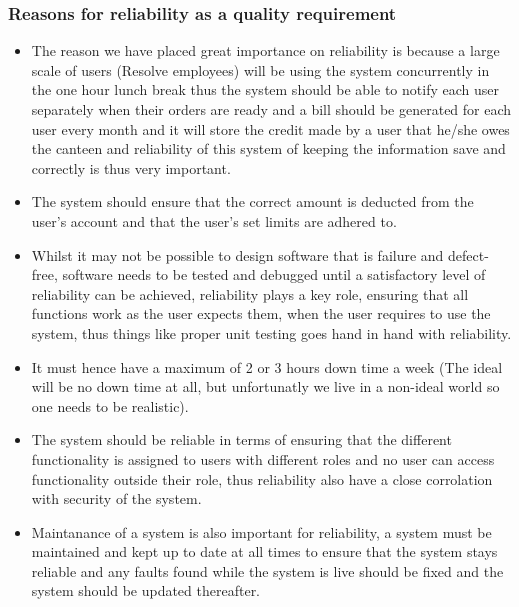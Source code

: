 \documentclass[a4paper,12pt]{article}
\begin{document}
\subsubsection{Reasons for reliability as a quality requirement}
\begin{itemize}
\item The reason we have placed great importance on reliability is because a large scale of users (Resolve employees) will be using the system concurrently in the one hour lunch break thus the system should be able to notify each user separately when their orders are ready and a bill should be generated for each user every month and it  will store the credit made by a user that he/she owes the canteen and reliability of this system of keeping the information save and correctly is thus very important.
\item The system should ensure that the correct amount is deducted from the user's account and that the user's set limits are adhered to.
\item Whilst it may not be possible to design software that is failure and defect-free, software needs to be tested and debugged 
until a satisfactory level of reliability can be achieved, reliability plays a key role, ensuring that all functions work as the user expects them, when the user requires to use the system, thus things like proper unit testing goes hand in hand with reliability.
\item It must hence have a maximum of 2 or 3 hours down time a week (The ideal will be no down time at all, but unfortunatly we live in a non-ideal world so one needs to be realistic).
\item The system should be reliable in terms of ensuring that the different functionality is assigned to users with different roles and no user can access functionality outside their role, thus reliability also have a close corrolation with security of the system.  
\item Maintanance of a system is also important for reliability, a system must be maintained and kept up to date at all times to ensure that the system stays reliable and any faults found while the system is live should be fixed and the system should be updated thereafter.
\end{itemize}
\end{document}
